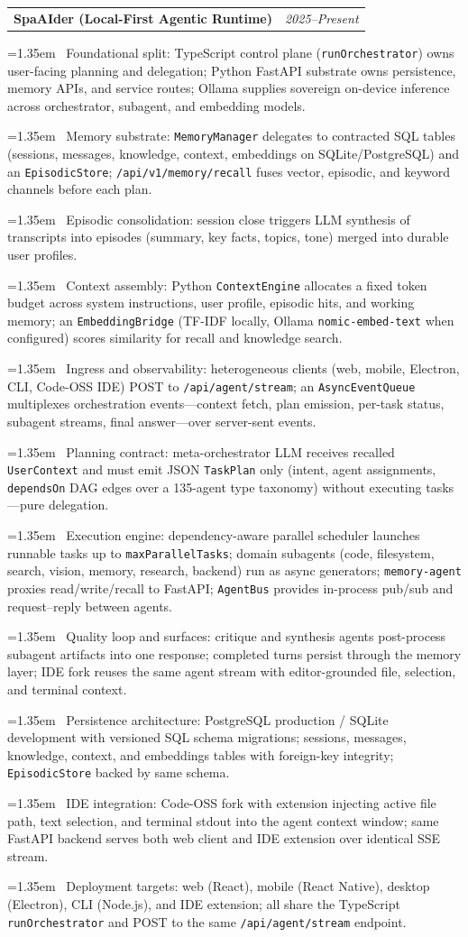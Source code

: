 \documentclass[11pt,letterpaper]{article}
\makeatletter
\newcommand{\cvitem}[1]{%
  \hangindent=1.35em\hangafter=1
  \noindent\hspace{0.55em}{\color{CVPrimary}\textendash}\ #1\par\vspace{0.05em}%
}
\newcommand{\cventryend}{\vspace{0.14em}}
\newcommand{\cvproject}[2]{%
  \noindent
  \begin{tabular*}{\textwidth}{@{}p{0.78\textwidth}@{\extracolsep{\fill}}r@{}}
    \textbf{#1} & \textit{\color{CVMuted}#2} \\
  \end{tabular*}%
  \par\vspace{0.08em}%
}
\newcommand{\cvtocentry}[1]{%
  \phantomsection%
  \addcontentsline{toc}{subsection}{#1}%
}
\makeatother
\begin{document}
\cvtocentry{SpaAIder}
\cvproject{SpaAIder (Local-First Agentic Runtime)}{2025--Present}
\cvitem{Foundational split: TypeScript control plane (\texttt{runOrchestrator}) owns user-facing planning and delegation; Python FastAPI substrate owns persistence, memory APIs, and service routes; Ollama supplies sovereign on-device inference across orchestrator, subagent, and embedding models.}
\cvitem{Memory substrate: \texttt{MemoryManager} delegates to contracted SQL tables (sessions, messages, knowledge, context, embeddings on SQLite/PostgreSQL) and an \texttt{EpisodicStore}; \texttt{/api/v1/memory/recall} fuses vector, episodic, and keyword channels before each plan.}
\cvitem{Episodic consolidation: session close triggers LLM synthesis of transcripts into episodes (summary, key facts, topics, tone) merged into durable user profiles.}
\cvitem{Context assembly: Python \texttt{ContextEngine} allocates a fixed token budget across system instructions, user profile, episodic hits, and working memory; an \texttt{EmbeddingBridge} (TF-IDF locally, Ollama \texttt{nomic-embed-text} when configured) scores similarity for recall and knowledge search.}
\cvitem{Ingress and observability: heterogeneous clients (web, mobile, Electron, CLI, Code-OSS IDE) POST to \texttt{/api/agent/stream}; an \texttt{AsyncEventQueue} multiplexes orchestration events---context fetch, plan emission, per-task status, subagent streams, final answer---over server-sent events.}
\cvitem{Planning contract: meta-orchestrator LLM receives recalled \texttt{UserContext} and must emit JSON \texttt{TaskPlan} only (intent, agent assignments, \texttt{dependsOn} DAG edges over a 135-agent type taxonomy) without executing tasks---pure delegation.}
\cvitem{Execution engine: dependency-aware parallel scheduler launches runnable tasks up to \texttt{maxParallelTasks}; domain subagents (code, filesystem, search, vision, memory, research, backend) run as async generators; \texttt{memory-agent} proxies read/write/recall to FastAPI; \texttt{AgentBus} provides in-process pub/sub and request--reply between agents.}
\cvitem{Quality loop and surfaces: critique and synthesis agents post-process subagent artifacts into one response; completed turns persist through the memory layer; IDE fork reuses the same agent stream with editor-grounded file, selection, and terminal context.}

\cvitem{Persistence architecture: PostgreSQL production / SQLite development with versioned SQL schema migrations; sessions, messages, knowledge, context, and embeddings tables with foreign-key integrity; \texttt{EpisodicStore} backed by same schema.}
\cvitem{IDE integration: Code-OSS fork with extension injecting active file path, text selection, and terminal stdout into the agent context window; same FastAPI backend serves both web client and IDE extension over identical SSE stream.}
\cvitem{Deployment targets: web (React), mobile (React Native), desktop (Electron), CLI (Node.js), and IDE extension; all share the TypeScript \texttt{runOrchestrator} and POST to the same \texttt{/api/agent/stream} endpoint.}
\cventryend
\end{document}
